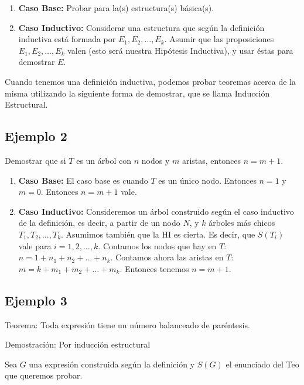 \documentclass[11pt]{article}
\begin{document}
    \begin{enumerate}
        \item \textbf{Caso Base:} Probar para la(s) estructura(s) básica(s).
        \item \textbf{Caso Inductivo:} Considerar una estructura que según la definición inductiva está formada por $E_1, E_2, \ldots, E_k$. Asumir que las proposiciones $E_1, E_2, \ldots, E_k$ valen (esto será nuestra Hipótesis Inductiva), y usar éstas para demostrar $E$.
    \end{enumerate}

    Cuando tenemos una definición inductiva, podemos probar teoremas acerca de la misma utilizando la siguiente forma de demostrar, que se llama Inducción Estructural.

    \bigskip %

    \subsection{Ejemplo 2}

    Demostrar que si $T$ es un árbol con $n$ nodos y $m$ aristas, entonces $n = m + 1$.

    \begin{enumerate}
        \item \textbf{Caso Base:} El caso base es cuando $T$ es un único nodo. Entonces $n = 1$ y $m = 0$. Entonces $n = m + 1$ vale.
        \item \textbf{Caso Inductivo:} Consideremos un árbol construido según el caso inductivo de la definición, es decir, a partir de un nodo $N$, y $k$ árboles más chicos $T_1, T_2, \ldots, T_k$. Asumimos también que la HI es cierta. Es decir, que $S(T_i)$ vale para $i = 1, 2, \ldots, k$. Contamos los nodos que hay en $T$: $n = 1 + n_1 + n_2 + \ldots + n_k$. Contamos ahora las aristas en $T$: $m = k + m_1 + m_2 + \ldots + m_k$. Entonces tenemos $n = m + 1$.
    \end{enumerate}

    \bigskip %

    \subsection{Ejemplo 3}

    Teorema: Toda expresión tiene un número balanceado de paréntesis.

    Demostración: Por inducción estructural

    Sea $G$ una expresión construida según la definición y $S(G)$ el enunciado del Teo que queremos probar.
\end{document}
